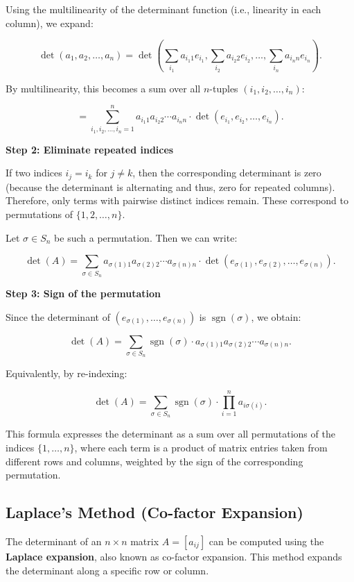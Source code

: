 Using the multilinearity of the determinant function (i.e., linearity in each column), we expand:

\[
\det(a_1, a_2, \dots, a_n) = \det\left( \sum_{i_1} a_{i_1 1} e_{i_1}, \sum_{i_2} a_{i_2 2} e_{i_2}, \dots, \sum_{i_n} a_{i_n n} e_{i_n} \right).
\]

By multilinearity, this becomes a sum over all \(n\)-tuples \( (i_1, i_2, \dots, i_n) \):

\[
= \sum_{i_1, i_2, \dots, i_n = 1}^n a_{i_1 1} a_{i_2 2} \cdots a_{i_n n} \cdot \det(e_{i_1}, e_{i_2}, \dots, e_{i_n}).
\]

\textbf{Step 2: Eliminate repeated indices}

If two indices \( i_j = i_k \) for \( j \neq k \), then the corresponding 
determinant is zero (because the determinant is alternating and thus, zero for repeated columns). 
Therefore, only terms with pairwise distinct indices remain. These correspond to permutations of \( \{1, 2, \dots, n\} \).

Let \( \sigma \in S_n \) be such a permutation. Then we can write:

\[
\det(A) = \sum_{\sigma \in S_n} a_{\sigma(1) 1} a_{\sigma(2) 2} \cdots a_{\sigma(n) n} \cdot \det(e_{\sigma(1)}, e_{\sigma(2)}, \dots, e_{\sigma(n)}).
\]

\textbf{Step 3: Sign of the permutation}

Since the determinant of \( (e_{\sigma(1)}, \dots, e_{\sigma(n)}) \) is \( \operatorname{sgn}(\sigma) \), we obtain:

\[
\det(A) = \sum_{\sigma \in S_n} \operatorname{sgn}(\sigma) \cdot a_{\sigma(1)1} a_{\sigma(2)2} \cdots a_{\sigma(n)n}.
\]

Equivalently, by re-indexing:

\[
\det(A) = \sum_{\sigma \in S_n} \operatorname{sgn}(\sigma) \cdot \prod_{i=1}^n a_{i \sigma(i)}.
\]


This formula expresses the determinant as a sum over all permutations of the indices \( \{1, \dots, n\} \), where each term is a product of matrix entries taken from different rows and columns, weighted by the sign of the corresponding permutation.


\subsection{Laplace's Method (Co-factor Expansion)}

The determinant of an \( n \times n \) matrix \( A = [a_{ij}] \) can be 
computed using the \textbf{Laplace expansion}, also known as co-factor expansion. 
This method expands the determinant along a specific row or column.

